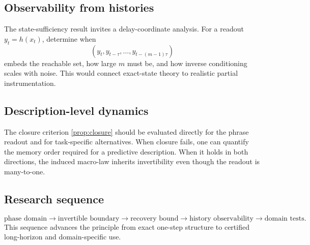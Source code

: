 \subsection{Observability from histories}

The state-sufficiency result invites a delay-coordinate analysis. For a readout \(y_t=h(x_t)\), determine when
\[
(y_t,y_{t-\tau},\ldots,y_{t-(m-1)\tau})
\]
embeds the reachable set, how large \(m\) must be, and how inverse conditioning scales with noise. This would connect exact-state theory to realistic partial instrumentation.

\subsection{Description-level dynamics}

The closure criterion \cref{prop:closure} should be evaluated directly for the phrase readout and for task-specific alternatives. When closure fails, one can quantify the memory order required for a predictive description. When it holds in both directions, the induced macro-law inherits invertibility even though the readout is many-to-one.

\subsection{Research sequence}

\[
\boxed{
\text{phase domain}
\longrightarrow
\text{invertible boundary}
\longrightarrow
\text{recovery bound}
\longrightarrow
\text{history observability}
\longrightarrow
\text{domain tests}.
}
\]
This sequence advances the principle from exact one-step structure to certified long-horizon and domain-specific use.

